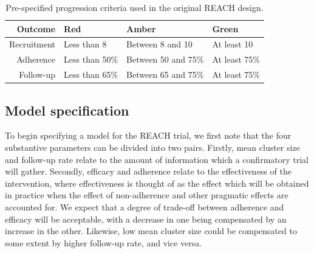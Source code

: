 \documentclass{article} %
\begin{document}
\begin{table}
\caption{Pre-specified progression criteria used in the original REACH design.}
\begin{tabular}{r l l l}
\toprule
Outcome & Red & Amber & Green \\
\midrule
Recruitment & Less than 8 & Between 8 and 10 & At least 10 \\
Adherence & Less than 50\% & Between 50 and 75\% & At least 75\% \\
Follow-up & Less than 65\% & Between 65 and 75\% & At least 75\% \\
\bottomrule
\end{tabular}
\label{tab:pcs}
\end{table}



\subsection{Model specification}

To begin specifying a model for the REACH trial, we first note that the four substantive parameters can be divided into two pairs. Firstly, mean cluster size and follow-up rate relate to the amount of information which a confirmatory trial will gather. Secondly, efficacy and adherence relate to the effectiveness of the intervention, where effectiveness is thought of as the effect which will be obtained in practice when the effect of non-adherence and other pragmatic effects are accounted for. We expect that a degree of trade-off between adherence and efficacy will be acceptable, with a decrease in one being compensated by an increase in the other. Likewise, low mean cluster size could be compensated to some extent by higher follow-up rate, and vice versa. 
\end{document}
